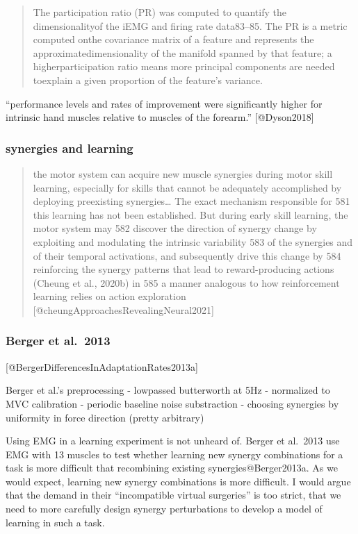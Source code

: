 \documentclass[../main.tex]{subfiles}
\begin{document}
\begin{quote}
The participation ratio (PR) was computed to quantify the dimensionalityof the iEMG and firing rate data83--85. The PR is a metric computed onthe covariance matrix of a feature and represents the approximatedimensionality of the manifold spanned by that feature; a higherparticipation ratio means more principal components are needed toexplain a given proportion of the feature's variance.
\end{quote}

``performance levels and rates of improvement were significantly higher for intrinsic hand muscles relative to muscles of the forearm.'' {[}@Dyson2018{]}

\subsubsection{synergies and learning}\label{synergies-and-learning}

\begin{quote}
the motor system can acquire new muscle synergies during motor skill learning, especially for skills that cannot be adequately accomplished by deploying preexisting synergies\ldots{} The exact mechanism responsible for 581 this learning has not been established. But during early skill learning, the motor system may 582 discover the direction of synergy change by exploiting and modulating the intrinsic variability 583 of the synergies and of their temporal activations, and subsequently drive this change by 584 reinforcing the synergy patterns that lead to reward-producing actions (Cheung et al., 2020b) in 585 a manner analogous to how reinforcement learning relies on action exploration {[}@cheungApproachesRevealingNeural2021{]}
\end{quote}

\subsubsection{Berger et al.~2013}\label{berger-et-al.-2013}

{[}@BergerDifferencesInAdaptationRates2013a{]}

Berger et al.'s preprocessing - lowpassed butterworth at 5Hz - normalized to MVC calibration - periodic baseline noise substraction - choosing synergies by uniformity in force direction (pretty arbitrary)

Using EMG in a learning experiment is not unheard of. Berger et al.~2013 use EMG with 13 muscles to test whether learning new synergy combinations for a task is more difficult that recombining existing synergies@Berger2013a. As we would expect, learning new synergy combinations is more difficult. I would argue that the demand in their ``incompatible virtual surgeries'' is too strict, that we need to more carefully design synergy perturbations to develop a model of learning in such a task.
\end{document}
